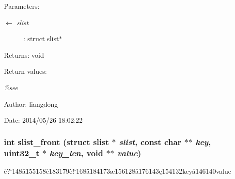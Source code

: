 \begin{Desc}
\item[Parameters:]
\begin{description}
\item[\mbox{$\leftarrow$} {\em slist}]: struct slist$\ast$ \end{description}
\end{Desc}
\begin{Desc}
\item[Returns:]void \end{Desc}
\begin{Desc}
\item[Return values:]
\begin{description}
\item[{\em @see}]\end{description}
\end{Desc}
\begin{Desc}
\item[Author:]liangdong \end{Desc}
\begin{Desc}
\item[Date:]2014/05/26 18:02:22 \end{Desc}
\subsubsection{\setlength{\rightskip}{0pt plus 5cm}int slist\_\-front (struct slist $\ast$ {\em slist}, const char $\ast$$\ast$ {\em key}, uint32\_\-t $\ast$ {\em key\_\-len}, void $\ast$$\ast$ {\em value})}\label{slist_8c_a12}


\`{e}?`148\aa{}155158\`{e}183179\`{e}!`168\"{a}184173\ae{}156128\aa{}176143\c{c}154132key\aa{}146140value 

